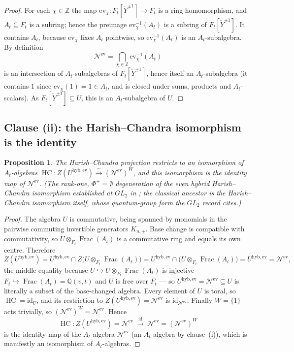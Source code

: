 \documentclass[11pt]{article}
\newtheorem{proposition}{Proposition}
\newcommand{\At}{A_t}
\newcommand{\Ft}{F_t}
\newcommand{\Nev}{\mathcal N^{\mathrm{ev}}}
\newcommand{\Uev}{U^{\mathrm{hyb,ev}}}
\newcommand{\HC}{\operatorname{HC}}
\newcommand{\Yc}{\check Y}
\newcommand{\Z}{\mathbb Z}
\newcommand{\ev}{\mathrm{ev}}
\begin{document}
\begin{proof}
For each $\chi\in\Z$ the map $\ev_\chi\colon\Ft[\Yc^{\pm1}]\to\Ft$ is a ring
homomorphism, and $\At\subseteq\Ft$ is a subring; hence the preimage
$\ev_\chi^{-1}(\At)$ is a subring of $\Ft[\Yc^{\pm1}]$. It contains $\At$,
because $\ev_\chi$ fixes $\At$ pointwise, so $\ev_\chi^{-1}(\At)$ is an
$\At$-subalgebra. By definition
\[
  \Nev=\bigcap_{\chi\in\Z}\ev_\chi^{-1}(\At)
\]
is an intersection of $\At$-subalgebras of $\Ft[\Yc^{\pm1}]$, hence itself an
$\At$-subalgebra (it contains $1$ since $\ev_\chi(1)=1\in\At$, and is closed
under sums, products and $\At$-scalars). As $\Ft[\Yc^{\pm1}]\subseteq U$, this
is an $\At$-subalgebra of $U$.
\end{proof}

\subsection{Clause (ii): the Harish--Chandra isomorphism is the identity}

\begin{proposition}
The Harish--Chandra projection restricts to an isomorphism of $\At$-algebras
$\HC\colon Z(\Uev)\xrightarrow{\ \sim\ }(\Nev)^{W}$, and this isomorphism is the
identity map of $\Nev$. (The rank-one, $\Phi^{+}=\emptyset$ degeneration of the
even hybrid Harish--Chandra isomorphism established at $GL_2$ in
\cite{SandboxGL2}; the classical ancestor is the Harish--Chandra isomorphism
itself, whose quantum-group form the $GL_2$ record cites.)
\end{proposition}

\begin{proof}
The algebra $U$ is commutative, being spanned by monomials in the pairwise
commuting invertible generators $K_{n,\pm}$. Base change is compatible with
commutativity, so $U\otimes_{\Ft}\operatorname{Frac}(\At)$ is a commutative ring
and equals its own centre. Therefore
\[
  Z(\Uev)=\Uev\cap Z\bigl(U\otimes_{\Ft}\operatorname{Frac}(\At)\bigr)
        =\Uev\cap\bigl(U\otimes_{\Ft}\operatorname{Frac}(\At)\bigr)
        =\Uev=\Nev,
\]
the middle equality because $U\hookrightarrow U\otimes_{\Ft}\operatorname{Frac}(\At)$
is injective --- $\Ft\hookrightarrow\operatorname{Frac}(\At)=\mathbb Q(v,t)$ and $U$ is
free over $\Ft$ --- so $\Uev=\Nev\subseteq U$ is literally a subset of the base-changed
algebra.
Every element of $U$ is toral, so $\HC=\mathrm{id}_U$, and its restriction to
$Z(\Uev)=\Nev$ is $\mathrm{id}_{\Nev}$. Finally $W=\{1\}$ acts trivially, so
$(\Nev)^{W}=\Nev$. Hence
\[
  \HC\colon Z(\Uev)=\Nev\ \xrightarrow{\ \mathrm{id}\ }\ \Nev=(\Nev)^{W}
\]
is the identity map of the $\At$-algebra $\Nev$ (an $\At$-algebra by clause~(i)),
which is manifestly an isomorphism of $\At$-algebras.
\end{proof}
\end{document}
